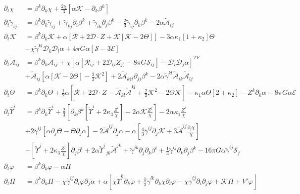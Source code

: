 \documentclass[11pt, oneside]{report}  %
\newcommand{\D}{\mathcal{D}}
\newcommand{\E}{\mathcal{E}}
\renewcommand{\S}{\mathcal{S}}
\newcommand{\K}{\mathcal{K}}
\newcommand{\R}{\mathcal{R}}
\newcommand{\vp}{\varphi}
\newcommand{\A}{\mathcal{A}}
\numberwithin{equation}{section}
\begin{document}
\begin{align} \partial_t \chi &=  \beta^k \partial_k \chi + \frac{2\chi}{3} \left[\alpha \K - \partial_k \beta^k \right]\\
\partial_t\tilde{\gamma}_{ij} &=  \beta^k\partial_k\tilde{\gamma}_{ij}  + \tilde{\gamma}_{kj}\partial_i \beta^k + \tilde{\gamma}_{ik}\partial_j\beta^k - \frac{2}{3}\tilde{\gamma}_{ij} \partial_k \beta^k - 2\alpha\tilde{\A}_{ij}\\
\partial_t\K &=  \beta^k\partial_k\K + \alpha\left[ \R + 2\D\cdot Z + \K\left[ \K-2\Theta\right]\right] - 3\alpha \kappa_1\left[ 1+\kappa_2\right]\Theta\\
&-\chi\tilde{\gamma}^{kl}\D_k\D_l\alpha + 4\pi G\alpha\left[ \S - 3\E\right]\nonumber \\
\partial_t\tilde{\A}_{ij} &=  \beta^k \partial_k \tilde{\A}_{ij}+\chi\left[\alpha\left[\R_{ij} + 2\D_{(i}Z_{j)}-8\pi G \S_{ij} \right] -\D_i\D_j\alpha \right]^{TF}\\
& +\tilde{\A}_{ij}\left[ \alpha\left[ \K-2\Theta\right]-\frac{2}{3}\K^2\right] + 2\tilde{\A}_{k(i}\partial_{j)}\beta^k -2\alpha\tilde{\gamma}^{kl}\tilde{\A}_{ik}\tilde{\A}_{lj}\nonumber\\
\partial_t\Theta &= \beta^k\partial_k \Theta + \frac{1}{2}\alpha\left[ \R + 2\D\cdot Z - \tilde{\A}_{kl} \tilde{\A}^{kl} + \frac{2}{3}\K^2 - 2\Theta\K\right] -\kappa_1\alpha\Theta\left[ 2+\kappa_2\right] - Z^k\partial_k\alpha - 8\pi G \alpha \E \\
\partial_t\hat{\Upsilon}^i &=  \beta^k \partial_k \hat{\Upsilon}^i + \frac{2}{3}\left[ \partial_k \beta^k \left[ \tilde{\Upsilon}^i+2\kappa_3 \frac{Z^{i}}{\chi}\right]-2\alpha\K\frac{Z^j}{\chi}\right]-2\alpha\kappa_1\frac{Z^i}{\chi}\\
& + 2\tilde{\gamma}^{ij}\left[ \alpha\partial_j\Theta -\Theta \partial_j\alpha \right] -2\tilde{\A}^{ij}\partial_j\alpha - \alpha\left[ \frac{4}{3}\tilde{\gamma}^{ij}\partial_j\K + 3\tilde{\A}^{ij}\frac{\partial_j \chi}{\chi}\right]\nonumber\\
& -\left[ \tilde{\Upsilon}^j + 2\kappa_3 \frac{Z^j}{\chi}\right]\partial_j \beta^i + 2\alpha \tilde{\Upsilon}^i_{\,\,\,jk}\tilde{\A}^{jk} + \tilde{\gamma}^{jk}\partial_j\partial_k \beta^i + \frac{1}{3} \tilde{\gamma}^{ij}\partial_k \partial_j \beta^k - 16\pi G \alpha \tilde{\gamma}^{ij}\S_j\nonumber\\
\partial_t \vp &= \beta^k\partial_k \vp - \alpha\Pi\\
\partial_t \Pi &= \beta^k\partial_k\Pi -\chi \tilde{\gamma}^{ij}\partial_i \vp \partial_j \alpha + \alpha \left[ \chi \tilde{\Upsilon}^k\partial_k \vp+\frac{1}{2} \tilde{\gamma}^{lk}\partial_k\chi\partial_l\vp  - \chi \tilde{\gamma}^{ij}\partial_i \partial_j \vp + \K \Pi + V' \vp \right]\end{align}
\end{document}
